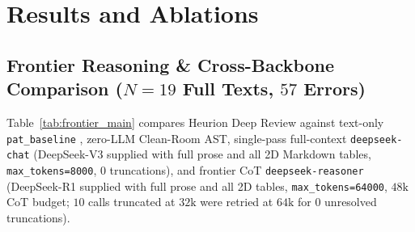 \documentclass[11pt,a4paper]{article}
\begin{document}
\section{Results and Ablations}
\label{sec:results}

\subsection{Frontier Reasoning \& Cross-Backbone Comparison (\texorpdfstring{$N=19$}{N=19} Full Texts, \texorpdfstring{$57$}{57} Errors)}
Table~\ref{tab:frontier_main} compares Heurion Deep Review against text-only \texttt{pat\_baseline} \cite{googlepat2026}, zero-LLM Clean-Room AST, single-pass full-context \texttt{deepseek-chat} (DeepSeek-V3 supplied with full prose and all 2D Markdown tables, \texttt{max\_tokens=8000}, $0$ truncations), and frontier CoT \texttt{deepseek-reasoner} (DeepSeek-R1 supplied with full prose and all 2D tables, \texttt{max\_tokens=64000}, $48\text{k}$ CoT budget; $10$ calls truncated at $32\text{k}$ were retried at $64\text{k}$ for $0$ unresolved truncations).
\end{document}
